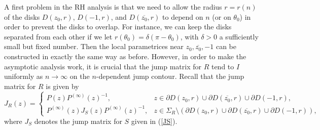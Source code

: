 \documentclass[11pt,fleqn]{article}
\numberwithin{equation}{section}
\begin{document}
A first problem in the RH analysis is that we need to allow the radius $r=r(n)$ of the disks $D(z_0,r)$, $D(-1,r)$, and $D(\overline{z_0},r)$ to depend on $n$ (or on $\theta_0$) in order to prevent the disks to overlap.
For instance, we can keep the disks separated from each other if we let $r(\theta_0)=\delta(\pi-\theta_0)$, with $\delta>0$ a sufficiently small but fixed number.
Then the local parametrices near $z_0, \overline{z_0}, -1$ can be constructed in exactly the same way as before. However, in order to make the asymptotic analysis work, it is crucial that the jump matrix for $R$ tend to $I$ uniformly as $n\to\infty$ on the $n$-dependent jump contour. Recall that the jump matrix for $R$ is given by
\begin{equation}
J_R(z)=\begin{cases}P(z)P^{(\infty)}(z)^{-1},&z\in\partial D(z_0,r)\cup \partial D(\overline{z_0},r)\cup \partial D(-1,r),\\
P^{(\infty)}(z)J_S(z) P^{(\infty)}(z)^{-1},&z\in\Sigma_R\setminus\left(\partial D(z_0,r)\cup \partial D(\overline{z_0},r)\cup \partial D(-1,r)\right),
\end{cases}
\end{equation}
where $J_S$ denotes the jump matrix for $S$ given in (\ref{JS}).
\end{document}
